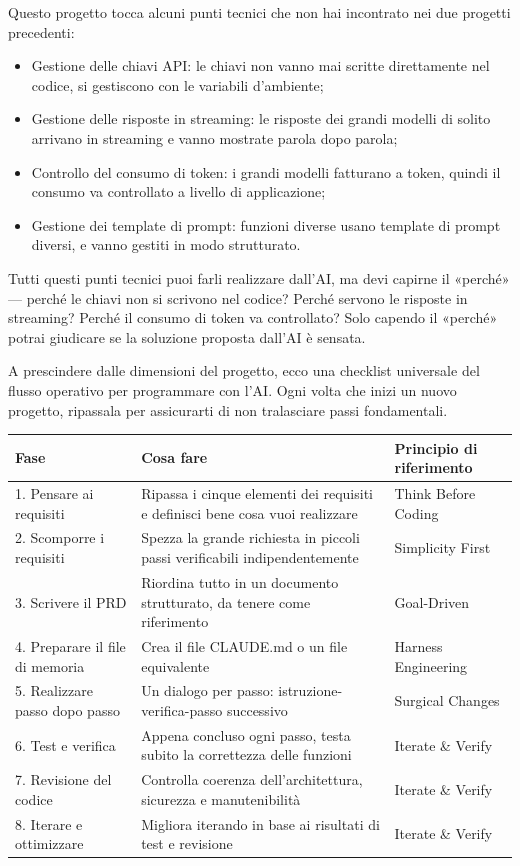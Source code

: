 
Questo progetto tocca alcuni punti tecnici che non hai incontrato nei due progetti precedenti:

\begin{itemize}
  \item Gestione delle chiavi API: le chiavi non vanno mai scritte direttamente nel codice, si gestiscono con le variabili d'ambiente;
  \item Gestione delle risposte in streaming: le risposte dei grandi modelli di solito arrivano in streaming e vanno mostrate parola dopo parola;
  \item Controllo del consumo di token: i grandi modelli fatturano a token, quindi il consumo va controllato a livello di applicazione;
  \item Gestione dei template di prompt: funzioni diverse usano template di prompt diversi, e vanno gestiti in modo strutturato.
\end{itemize}

Tutti questi punti tecnici puoi farli realizzare dall'AI, ma devi capirne il «perché» — perché le chiavi non si scrivono nel codice? Perché servono le risposte in streaming? Perché il consumo di token va controllato? Solo capendo il «perché» potrai giudicare se la soluzione proposta dall'AI è sensata.


A prescindere dalle dimensioni del progetto, ecco una checklist universale del flusso operativo per programmare con l'AI. Ogni volta che inizi un nuovo progetto, ripassala per assicurarti di non tralasciare passi fondamentali.

\begin{center}
\begin{tabularx}{\linewidth}{|X|X|X|}
\hline
\textbf{Fase} & \textbf{Cosa fare} & \textbf{Principio di riferimento} \tabularnewline
\hline
1. Pensare ai requisiti & Ripassa i cinque elementi dei requisiti e definisci bene cosa vuoi realizzare & Think Before Coding \tabularnewline
2. Scomporre i requisiti & Spezza la grande richiesta in piccoli passi verificabili indipendentemente & Simplicity First \tabularnewline
3. Scrivere il PRD & Riordina tutto in un documento strutturato, da tenere come riferimento & Goal-Driven \tabularnewline
4. Preparare il file di memoria & Crea il file CLAUDE.md o un file equivalente & Harness Engineering \tabularnewline
5. Realizzare passo dopo passo & Un dialogo per passo: istruzione-verifica-passo successivo & Surgical Changes \tabularnewline
6. Test e verifica & Appena concluso ogni passo, testa subito la correttezza delle funzioni & Iterate \& Verify \tabularnewline
7. Revisione del codice & Controlla coerenza dell'architettura, sicurezza e manutenibilità & Iterate \& Verify \tabularnewline
8. Iterare e ottimizzare & Migliora iterando in base ai risultati di test e revisione & Iterate \& Verify \tabularnewline
\hline
\end{tabularx}
\end{center}

